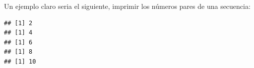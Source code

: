 \documentclass[11pt,]{article}
\newenvironment{Shaded}{\begin{snugshade}}{\end{snugshade}}
\newcommand{\ControlFlowTok}[1]{\textcolor[rgb]{0.13,0.29,0.53}{\textbf{#1}}}
\newcommand{\DecValTok}[1]{\textcolor[rgb]{0.00,0.00,0.81}{#1}}
\newcommand{\KeywordTok}[1]{\textcolor[rgb]{0.13,0.29,0.53}{\textbf{#1}}}
\newcommand{\NormalTok}[1]{#1}
\newcommand{\OperatorTok}[1]{\textcolor[rgb]{0.81,0.36,0.00}{\textbf{#1}}}
\begin{document}
Un ejemplo claro seria el siguiente, imprimir los números pares de una
secuencia:

\begin{Shaded}
\end{Shaded}

\begin{verbatim}
## [1] 2
## [1] 4
## [1] 6
## [1] 8
## [1] 10
\end{verbatim}

\newpage
\singlespacing 
\end{document}
